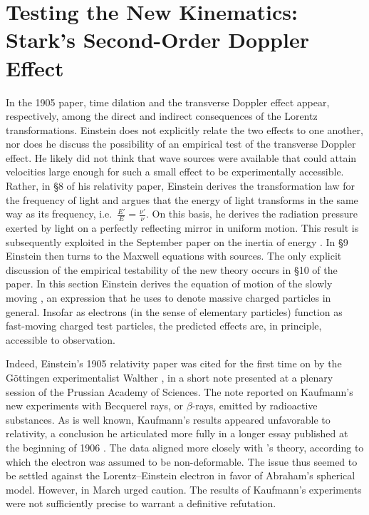 \documentclass[pdflatex,sn-basic]{sn-jnl}
\begin{document}
\section{Testing the New Kinematics: Stark's Second-Order Doppler Effect}



In the 1905 paper, time dilation and the transverse Doppler effect appear, respectively, among the direct and indirect consequences of the Lorentz transformations. Einstein does not explicitly relate the two effects to one another, nor does he discuss the possibility of an empirical test of the transverse Doppler effect. He likely did not think that wave sources were available that could attain velocities large enough for such a small effect to be experimentally accessible. Rather, in \S8 of his relativity paper, Einstein derives the transformation law for the frequency of light and argues that the energy of light transforms in the same way as its frequency, i.e.\ $\frac{E'}{E}=\frac{\nu'}{\nu}$. On this basis, he derives the radiation pressure exerted by light on a perfectly reflecting mirror in uniform motion. This result is subsequently exploited in the September paper on the inertia of energy \citep{Einstein1905b}. In \S9 Einstein then turns to the Maxwell equations with sources. The only explicit discussion of the empirical testability of the new theory occurs in \S10 of the paper. In this section Einstein derives the equation of motion of the slowly moving , an expression that he uses to denote massive charged particles in general. Insofar as electrons (in the sense of elementary particles) function as fast-moving charged test particles, the predicted effects are, in principle, accessible to observation.

Indeed, Einstein’s 1905 relativity paper was cited for the first time on  by the Göttingen experimentalist Walther \citet[954]{Kaufmann1905}, in a short note presented at a plenary session of the Prussian Academy of Sciences. The note reported on Kaufmann’s new experiments with Becquerel rays, or $\beta$-rays, emitted by radioactive substances. As is well known, Kaufmann’s results appeared unfavorable to relativity, a conclusion he articulated more fully in a longer essay published at the beginning of 1906 \citep{Kaufmann1906}. The data aligned more closely with \Abr's theory, according to which the electron was assumed to be non-deformable. The issue thus seemed to be settled against the Lorentz--Einstein electron in favor of Abraham’s spherical model. However, in March \citet{Planck1906a} urged caution. The results of Kaufmann’s experiments were not sufficiently precise to warrant a definitive refutation.
\end{document}
